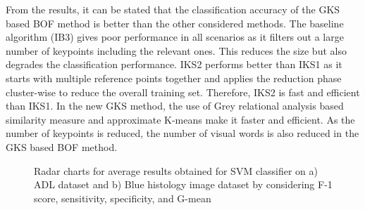From the results, it can be stated that the classification accuracy of the GKS based BOF method is better than the other considered methods. The baseline algorithm (IB3) gives poor performance in all scenarios as it filters out a large number of keypoints including the relevant ones. This reduces the size but also degrades the classification performance. IKS2 performs better than IKS1 as it starts with multiple reference points together and applies the reduction phase cluster-wise to reduce the overall training set. Therefore, IKS2 is fast and efficient than IKS1.  In the new GKS method, the use of Grey relational analysis based similarity measure and approximate K-means make it faster and efficient. As the number of keypoints is reduced, the number of visual words is also reduced in the GKS based BOF method.
\begin{figure}[h]
\centering
{}
 \caption[Radar charts for average results obtained for SVM classifier on ADL dataset and Blue histology image dataset by considering F-1 score, sensitivity, specificity, and G-mean]{\fontsize{10pt}{12pt}\selectfont Radar charts for average results obtained for SVM classifier on a) ADL dataset and b) Blue histology image dataset by considering F-1 score, sensitivity, specificity, and G-mean}
\label{ch3:fig:rc}
\end{figure}

